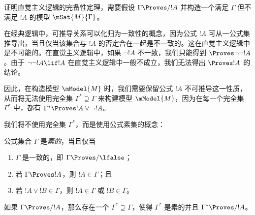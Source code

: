 \documentclass[../../../include/open-logic-section]{subfiles}
\begin{document}


证明直觉主义逻辑的完备性定理，需要假设 $\Gamma \Proves/ !A$ 并构造一个满足 $\Gamma$ 但不满足 $!A$ 的模型 $\mSat{M}{\Gamma}$。

在经典逻辑中，可推导关系可以化归为一致性的概念，因为公式 $!A$ 可从一公式集推导出，当且仅当该集合与 $!A$ 的否定合在一起是不一致的。这在直觉主义逻辑中是不可能的。在直觉主义逻辑中，如果 $\lnot!A$ 不一致，我们只能得到 $\Proves \lnot\lnot !A$。由于 $\lnot\lnot!A \lif !A$ 在直觉主义逻辑中一般不成立，我们无法得出 $\Proves !A$ 的结论。

因此，在构造模型 $\mModel{M}$ 时，我们需要保留公式 $!A$ 不可推导这一性质，从而将无法使用完全集 $\Gamma^* \supseteq \Gamma$ 来构建模型 $\mModel{M}$，因为在每一个完全集 $\Gamma^*$ 中，都有 $\Gamma^* \Proves !A \lor \lnot !A$。

我们将不使用完全集 $\Gamma^*$，而是使用公式素集的概念：

\begin{defn}
  公式集合 $\Gamma$ 是\emph{素的}，当且仅当
  \begin{enumerate}
  \item{} $\Gamma$ 是一致的，即 $\Gamma \Proves/ \lfalse$；
  \item{} 若 $\Gamma \Proves !A$，则 $!A \in \Gamma$；且
  \item{} 若 $!A \lor !B \in \Gamma$，则 $!A \in \Gamma$ 或 $!B \in \Gamma$。
  \end{enumerate}
\end{defn}

\begin{lem}[Lindenbaum 引理]
   如果 $\Gamma \Proves/ !A$，那么存在一个 $\Gamma^* \supseteq \Gamma$，使得 $\Gamma^*$ 是素的并且 $\Gamma^* \Proves/ !A$。
\end{lem}
\end{document}
